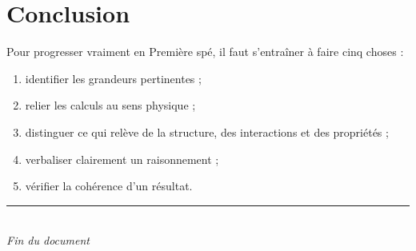 \documentclass[11pt,a4paper]{article}
\begin{document}
\section{Conclusion}

\begin{objectifbox}
Pour progresser vraiment en Première spé, il faut s'entraîner à faire cinq choses :
\begin{enumerate}
    \item identifier les grandeurs pertinentes ;
    \item relier les calculs au sens physique ;
    \item distinguer ce qui relève de la structure, des interactions et des propriétés ;
    \item verbaliser clairement un raisonnement ;
    \item vérifier la cohérence d'un résultat.
\end{enumerate}
\end{objectifbox}

\vfill

\begin{center}
\rule{0.82\linewidth}{0.5pt}\\
\textit{Fin du document}
\end{center}
\end{document}
